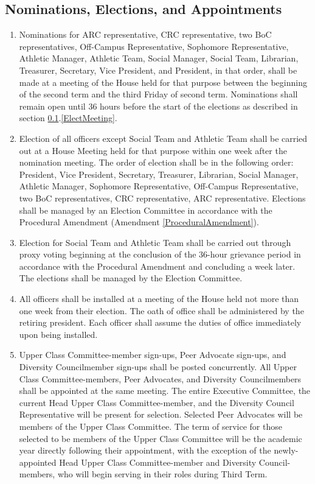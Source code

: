 \documentclass[10pt]{article} %
\begin{document}
\subsection{Nominations, Elections, and Appointments}
\label{NomsElects}
\begin{enumerate}
\item Nominations for ARC representative, CRC representative, two BoC representatives, Off-Campus Representative, Sophomore Representative, Athletic Manager, Athletic Team, Social Manager, Social Team, Librarian, Treasurer, Secretary, Vice President, and President, in that order, shall be made at a meeting of the House held for that purpose between the beginning of the second term and the third Friday of second term. Nominations shall remain open until 36 hours before the start of the elections as described in section \ref{NomsElects}.\ref{ElectMeeting}.
\item \label{ElectMeeting} Election of all officers except Social Team and Athletic Team shall be carried out at a House Meeting held for that purpose within one week after the nomination meeting. The order of election shall be in the following order: President, Vice President, Secretary, Treasurer, Librarian, Social Manager, Athletic Manager, Sophomore Representative, Off-Campus Representative, two BoC representatives, CRC representative, ARC representative. Elections shall be managed by an Election Committee in accordance with the Procedural Amendment (Amendment \ref{ProceduralAmendment}).
\item Election for Social Team and Athletic Team shall be carried out through proxy voting beginning at the conclusion of the 36-hour grievance period in accordance with the Procedural Amendment and concluding a week later. The elections shall be managed by the Election Committee.
\item All officers shall be installed at a meeting of the House held not more than one week from their election. The oath of office shall be administered by the retiring president. Each officer shall assume the duties of office immediately upon being installed.
\item Upper Class Committee-member sign-ups, Peer Advocate sign-ups, and Diversity Councilmember sign-ups shall be posted concurrently. All Upper Class Committee-members, Peer Advocates, and Diversity Councilmembers shall be appointed at the same meeting. The entire Executive Committee, the current Head Upper Class Committee-member, and the Diversity Council Representative will be present for selection. Selected Peer Advocates will be members of the Upper Class Committee. The term of service for those selected to be members of the Upper Class Committee will be the academic year directly following their appointment, with the exception of the newly-appointed Head Upper Class Committee-member and Diversity Council-members, who will begin serving in their roles during Third Term.

\end{enumerate}
\end{document}
